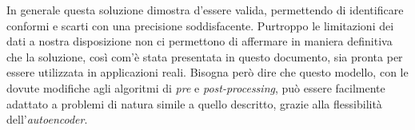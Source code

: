 In generale questa soluzione dimostra d'essere valida, permettendo di identificare conformi e scarti con una precisione soddisfacente.
Purtroppo le limitazioni dei dati a nostra disposizione non ci permettono di affermare in maniera definitiva che la soluzione, così com'è stata presentata in questo documento, sia pronta per essere utilizzata in applicazioni reali.
Bisogna però dire che questo modello, con le dovute modifiche agli algoritmi di \textit{pre} e \textit{post-processing}, può essere facilmente adattato a problemi di natura simile a quello descritto, grazie alla flessibilità dell'\textit{autoencoder}.

